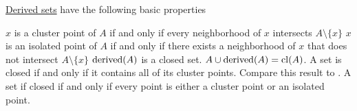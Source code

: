 \begin{proposition}\label{thm:def:derived_set/properties}
  \hyperref[def:topological_derived_set]{Derived sets} have the following basic properties
  \begin{thmenum}
     \( x \) is a cluster point of \( A \) if and only if every neighborhood of \( x \) intersects \( A \setminus \{ x \} \)
     \( x \) is an isolated point of \( A \) if and only if there exists a neighborhood of \( x \) that does not intersect \( A \setminus \{ x \} \)
     \( \operatorname{derived}(A) \) is a closed set.
     \( A \cup \operatorname{derived}(A) = \operatorname{cl}(A) \).
     A set is closed if and only if it contains all of its cluster points. Compare this result to .
     A set if closed if and only if every point is either a cluster point or an isolated point.
  \end{thmenum}
\end{proposition}
